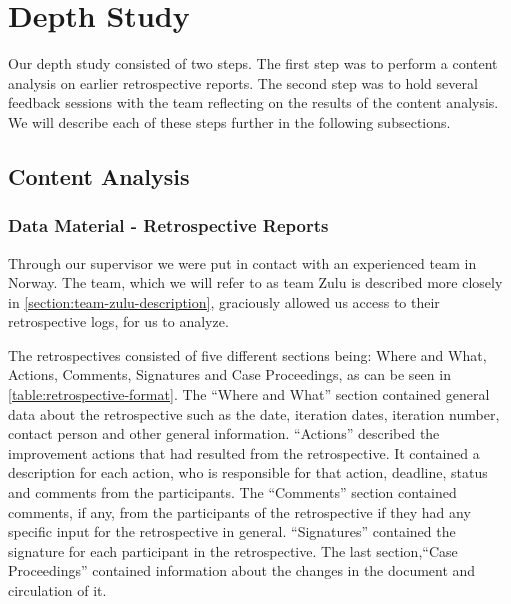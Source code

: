 \section{Depth Study}
Our depth study consisted of two steps. The first step was to perform a content analysis on earlier retrospective reports. The second step was to hold several feedback sessions with the team reflecting on the results of the content analysis. We will describe each of these steps further in the following subsections.

\subsection{Content Analysis}

\subsubsection{Data Material - Retrospective Reports}
Through our supervisor we were put in contact with an experienced team in Norway. The team, which we will refer to as team Zulu is described more closely in \autoref{section:team-zulu-description}, graciously allowed us access to their retrospective logs, for us to analyze.

The retrospectives consisted of five different sections being: Where and What, Actions, Comments, Signatures and Case Proceedings, as can be seen in \autoref{table:retrospective-format}. 
The ``Where and What'' section contained general data about the retrospective such as the date, iteration dates, iteration number, contact person and other general information. ``Actions'' described the improvement actions that had resulted from the retrospective. It contained a description for each action, who is responsible for that action, deadline, status and comments from the participants. The ``Comments'' section contained comments, if any, from the participants of the retrospective if they had any specific input for the retrospective in general. ``Signatures'' contained the signature for each participant in the retrospective. The last section,``Case Proceedings'' contained information about the changes in the document and circulation of it.

